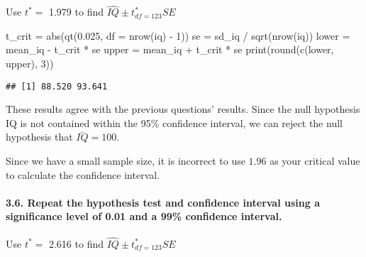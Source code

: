 \documentclass[
]{article}
\newenvironment{Shaded}{\begin{snugshade}}{\end{snugshade}}
\newcommand{\AttributeTok}[1]{\textcolor[rgb]{0.77,0.63,0.00}{#1}}
\newcommand{\DecValTok}[1]{\textcolor[rgb]{0.00,0.00,0.81}{#1}}
\newcommand{\FloatTok}[1]{\textcolor[rgb]{0.00,0.00,0.81}{#1}}
\newcommand{\FunctionTok}[1]{\textcolor[rgb]{0.00,0.00,0.00}{#1}}
\newcommand{\NormalTok}[1]{#1}
\newcommand{\OtherTok}[1]{\textcolor[rgb]{0.56,0.35,0.01}{#1}}
\newcommand{\SpecialCharTok}[1]{\textcolor[rgb]{0.00,0.00,0.00}{#1}}
\begin{document}
Use \(t^*=\) 1.979 to find \(\hat{IQ} \pm t^*_{df=123}SE\)

\begin{Shaded}
\begin{Highlighting}[]
\NormalTok{t\_crit }\OtherTok{=} \FunctionTok{abs}\NormalTok{(}\FunctionTok{qt}\NormalTok{(}\FloatTok{0.025}\NormalTok{, }\AttributeTok{df =} \FunctionTok{nrow}\NormalTok{(iq) }\SpecialCharTok{{-}} \DecValTok{1}\NormalTok{))}
\NormalTok{se }\OtherTok{=}\NormalTok{ sd\_iq }\SpecialCharTok{/} \FunctionTok{sqrt}\NormalTok{(}\FunctionTok{nrow}\NormalTok{(iq))}
\NormalTok{lower }\OtherTok{=}\NormalTok{ mean\_iq }\SpecialCharTok{{-}}\NormalTok{ t\_crit }\SpecialCharTok{*}\NormalTok{ se}
\NormalTok{upper }\OtherTok{=}\NormalTok{ mean\_iq }\SpecialCharTok{+}\NormalTok{ t\_crit }\SpecialCharTok{*}\NormalTok{ se}
\FunctionTok{print}\NormalTok{(}\FunctionTok{round}\NormalTok{(}\FunctionTok{c}\NormalTok{(lower, upper), }\DecValTok{3}\NormalTok{))}
\end{Highlighting}
\end{Shaded}

\begin{verbatim}
## [1] 88.520 93.641
\end{verbatim}

These results agree with the previous questions' results. Since the null
hypothesis IQ is not contained within the 95\% confidence interval, we
can reject the null hypothesis that \(\bar{IQ}=100\).

Since we have a small sample size, it is incorrect to use \(1.96\) as
your critical value to calculate the confidence interval.

\hypertarget{repeat-the-hypothesis-test-and-confidence-interval-using-a-significance-level-of-0.01-and-a-99-confidence-interval.}{%
\paragraph{3.6. Repeat the hypothesis test and confidence interval using
a significance level of 0.01 and a 99\% confidence
interval.}\label{repeat-the-hypothesis-test-and-confidence-interval-using-a-significance-level-of-0.01-and-a-99-confidence-interval.}}

Use \(t^*=\) 2.616 to find \(\hat{IQ} \pm t^*_{df=123}SE\)
\end{document}
